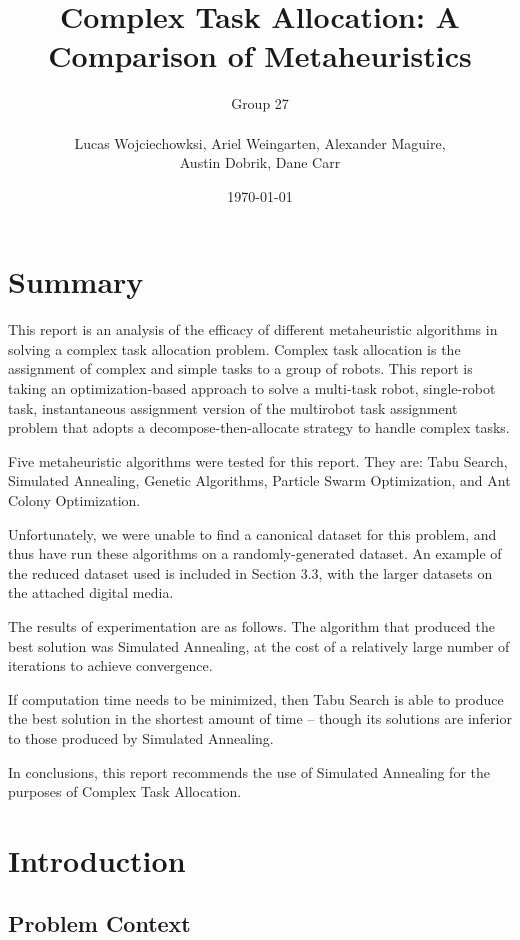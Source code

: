\documentclass[a4paper]{article}
\title{Complex Task Allocation: A Comparison of Metaheuristics}
\author{
	Group 27 \\
	\\
	Lucas Wojciechowksi, Ariel Weingarten, Alexander Maguire, \\
	Austin Dobrik, Dane Carr}
\date{\today}
\begin{document}
\maketitle

\listoftodos

\section*{Summary}

This report is an analysis of the efficacy of different metaheuristic algorithms in solving a complex task allocation problem.
Complex task allocation is the assignment of complex and simple tasks to a group of robots. This report is taking an optimization-based approach to solve a multi-task robot, single-robot task, instantaneous assignment version of the multirobot task assignment problem that adopts a decompose-then-allocate strategy to handle complex tasks.

Five metaheuristic algorithms were tested for this report. They are: Tabu Search, Simulated Annealing, Genetic Algorithms, Particle Swarm Optimization, and Ant Colony Optimization.

Unfortunately, we were unable to find a canonical dataset for this problem, and thus have run these algorithms on a randomly-generated dataset. An example of the reduced dataset used is included in Section 3.3, with the larger datasets on the attached digital media.

The results of experimentation are as follows. The algorithm that produced the best solution was Simulated Annealing, at the cost of a relatively large number of iterations to achieve convergence.

If computation time needs to be minimized, then Tabu Search is able to produce the best solution in the shortest amount of time -- though its solutions are inferior to those produced by Simulated Annealing.

In conclusions, this report recommends the use of Simulated Annealing for the purposes of Complex Task Allocation.

\section{Introduction}

\subsection{Problem Context}
\end{document}
